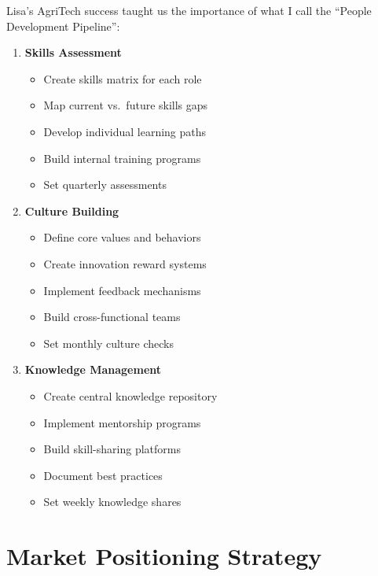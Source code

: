 Lisa's AgriTech success taught us the importance of what I call the ``People Development Pipeline'':

\begin{tcolorbox}[colback=white,colframe=primarydark,title=\textbf{Workforce Development Steps}]
    \begin{enumerate}
        \item \textbf{Skills Assessment}
        \begin{itemize}
            \item Create skills matrix for each role
            \item Map current vs.\ future skills gaps
            \item Develop individual learning paths
            \item Build internal training programs
            \item Set quarterly assessments
        \end{itemize}

        \item \textbf{Culture Building}
        \begin{itemize}
            \item Define core values and behaviors
            \item Create innovation reward systems
            \item Implement feedback mechanisms
            \item Build cross-functional teams
            \item Set monthly culture checks
        \end{itemize}

        \item \textbf{Knowledge Management}
        \begin{itemize}
            \item Create central knowledge repository
            \item Implement mentorship programs
            \item Build skill-sharing platforms
            \item Document best practices
            \item Set weekly knowledge shares
        \end{itemize}
    \end{enumerate}
\end{tcolorbox}


\section{Market Positioning Strategy}\label{sec:market-positioning-strategy}

